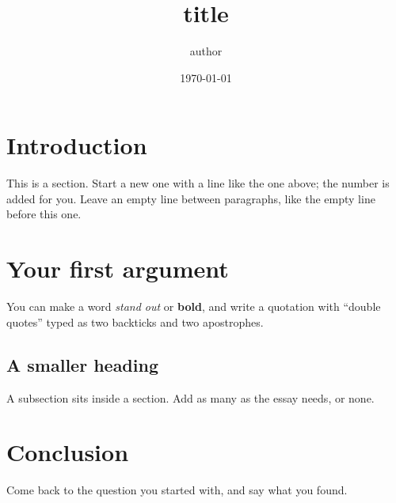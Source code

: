 \documentclass[11pt]{article}
\title{{{title}}}
\author{{{author}}}
\date{\today}
\begin{document}
\maketitle

\section{Introduction}

This is a section. Start a new one with a line like the one above; the number is added for you.
Leave an empty line between paragraphs, like the empty line before this one.

\section{Your first argument}

You can make a word \emph{stand out} or \textbf{bold}, and write a quotation with
``double quotes'' typed as two backticks and two apostrophes.

\subsection{A smaller heading}

A subsection sits inside a section. Add as many as the essay needs, or none.

\section{Conclusion}

Come back to the question you started with, and say what you found.
\end{document}
